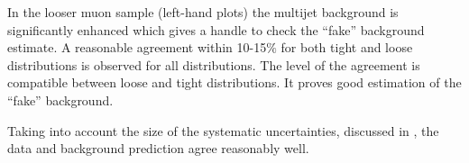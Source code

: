In the looser muon sample (left-hand plots) the multijet background is significantly enhanced which gives a handle to check the ``fake'' background estimate. 
A reasonable agreement within 10-15$\%$ for both tight and loose distributions is observed for all distributions.
The level of the agreement is compatible between loose and tight distributions.
It proves good estimation of the ``fake'' background.

Taking into account the size of the systematic uncertainties, discussed in , the data and background prediction agree reasonably well. 





